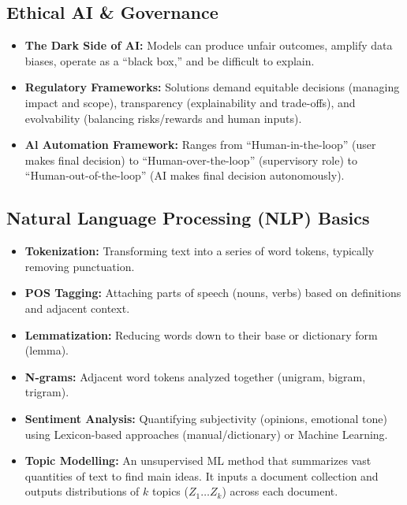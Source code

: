 \subsection{Ethical AI \& Governance}
\begin{itemize}
    \item \textbf{The Dark Side of AI:} Models can produce unfair outcomes, amplify data biases,
          operate as a ``black box,'' and be difficult to explain.
    \item \textbf{Regulatory Frameworks:} Solutions demand equitable decisions (managing impact
          and scope), transparency (explainability and trade-offs), and evolvability
          (balancing risks/rewards and human inputs).
    \item \textbf{Al Automation Framework:} Ranges from ``Human-in-the-loop'' (user makes final
          decision) to ``Human-over-the-loop'' (supervisory role) to
          ``Human-out-of-the-loop'' (AI makes final decision autonomously).
\end{itemize}

\subsection{Natural Language Processing (NLP) Basics}
\begin{itemize}
    \item \textbf{Tokenization:} Transforming text into a series of word tokens, typically
          removing punctuation.
    \item \textbf{POS Tagging:} Attaching parts of speech (nouns, verbs) based on definitions and
          adjacent context.
    \item \textbf{Lemmatization:} Reducing words down to their base or dictionary form (lemma).
    \item \textbf{N-grams:} Adjacent word tokens analyzed together (unigram, bigram, trigram).
    \item \textbf{Sentiment Analysis:} Quantifying subjectivity (opinions, emotional tone) using
          Lexicon-based approaches (manual/dictionary) or Machine Learning.
    \item \textbf{Topic Modelling:} An unsupervised ML method that summarizes vast quantities of
          text to find main ideas. It inputs a document collection and outputs
          distributions of $k$ topics ($Z_1 \dots Z_k$) across each document.
\end{itemize}